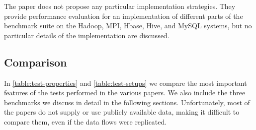 The paper does not propose any particular implementation strategies. They provide performance evaluation for an implementation of different parts of the benchmark suite on the Hadoop, MPI, Hbase, Hive, and MySQL systems, but no particular details of the implementation are discussed.

\subsection{Comparison}
In \autoref{table:test-properties} and \autoref{table:test-setups} we compare the most important features of the tests performed in the various papers. We also include the three benchmarks we discuss in detail in the following sections. Unfortunately, most of the papers do not supply or use publicly available data, making it difficult to compare them, even if the data flows were replicated.

